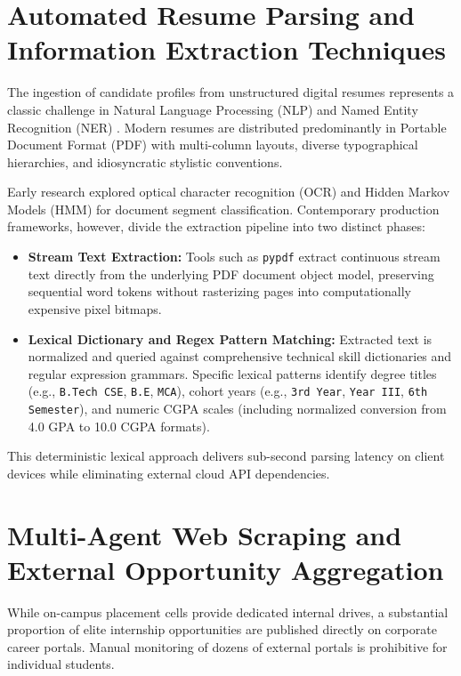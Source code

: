 \section{Automated Resume Parsing and Information Extraction Techniques} \label{S2.3}
The ingestion of candidate profiles from unstructured digital resumes represents a classic challenge in Natural Language Processing (NLP) and Named Entity Recognition (NER) \cite{ref1,ref3}. Modern resumes are distributed predominantly in Portable Document Format (PDF) with multi-column layouts, diverse typographical hierarchies, and idiosyncratic stylistic conventions.

Early research explored optical character recognition (OCR) and Hidden Markov Models (HMM) for document segment classification. Contemporary production frameworks, however, divide the extraction pipeline into two distinct phases:
\begin{itemize}
	\item \textbf{Stream Text Extraction:} Tools such as \texttt{pypdf} extract continuous stream text directly from the underlying PDF document object model, preserving sequential word tokens without rasterizing pages into computationally expensive pixel bitmaps.
	\item \textbf{Lexical Dictionary and Regex Pattern Matching:} Extracted text is normalized and queried against comprehensive technical skill dictionaries and regular expression grammars. Specific lexical patterns identify degree titles (e.g., \texttt{B.Tech CSE}, \texttt{B.E}, \texttt{MCA}), cohort years (e.g., \texttt{3rd Year}, \texttt{Year III}, \texttt{6th Semester}), and numeric CGPA scales (including normalized conversion from 4.0 GPA to 10.0 CGPA formats).
\end{itemize}
This deterministic lexical approach delivers sub-second parsing latency on client devices while eliminating external cloud API dependencies.

\section{Multi-Agent Web Scraping and External Opportunity Aggregation} \label{S2.4}
While on-campus placement cells provide dedicated internal drives, a substantial proportion of elite internship opportunities are published directly on corporate career portals. Manual monitoring of dozens of external portals is prohibitive for individual students. 

